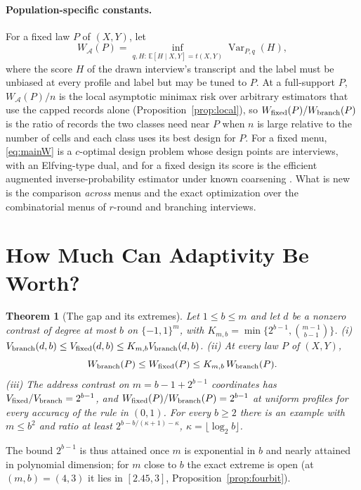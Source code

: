 \documentclass{article}
\newtheorem{theorem}{Theorem}
\newcommand{\E}{\mathbb{E}}
\newcommand{\Var}{\operatorname{Var}}
\newcommand{\A}{\mathcal A}
\begin{document}
\paragraph{Population-specific constants.}
For a fixed law $P$ of $(X,Y)$, let
\begin{equation}
 W_{\A}(P)=\inf_{q,H:\,\E[H\mid X,Y]=t(X,Y)}\Var_{P,q}(H),\label{eq:mainW}
\end{equation}
where the score $H$ of the drawn interview's transcript and the label must be unbiased at every profile and label but may be tuned to $P$. At a full-support $P$, $W_\A(P)/n$ is the local asymptotic minimax risk over arbitrary estimators that use the capped records alone (Proposition~\ref{prop:local}), so $W_{\rm fixed}(P)/W_{\rm branch}(P)$ is the ratio of records the two classes need near $P$ when $n$ is large relative to the number of cells and each class uses its best design for $P$. For a fixed menu, \eqref{eq:mainW} is a $c$-optimal design problem whose design points are interviews, with an Elfving-type dual, and for a fixed design its score is the efficient augmented inverse-probability estimator under known coarsening \citep{elfving1952,pukelsheim1993,robins1994,tsiatis2006}. What is new is the comparison \emph{across} menus and the exact optimization over the combinatorial menus of $r$-round and branching interviews.

\section{How Much Can Adaptivity Be Worth?}\label{sec:gap}
\begin{theorem}[The gap and its extremes]\label{thm:universal}
Let $1\le b\le m$ and let $d$ be a nonzero contrast of degree at most $b$ on $\{-1,1\}^m$, with $K_{m,b}=\min\{2^{b-1},\binom{m-1}{b-1}\}$.
\textup{(i)} $V_{\rm branch}(d,b)\le V_{\rm fixed}(d,b)\le K_{m,b}V_{\rm branch}(d,b)$.
\textup{(ii)} At every law $P$ of $(X,Y)$,
\begin{equation}
 W_{\rm branch}(P)\le W_{\rm fixed}(P)\le K_{m,b}\,W_{\rm branch}(P).\label{eq:universal}
\end{equation}
\textup{(iii)} The address contrast on $m=b-1+2^{b-1}$ coordinates has $V_{\rm fixed}/V_{\rm branch}=2^{b-1}$, and $W_{\rm fixed}(P)/W_{\rm branch}(P)=2^{b-1}$ at uniform profiles for every accuracy of the rule in $(0,1)$. For every $b\ge2$ there is an example with $m\le b^2$ and ratio at least $2^{b-b/(\kappa+1)-\kappa}$, $\kappa=\lfloor\log_2 b\rfloor$.
\end{theorem}
The bound $2^{b-1}$ is thus attained once $m$ is exponential in $b$ and nearly attained in polynomial dimension; for $m$ close to $b$ the exact extreme is open (at $(m,b)=(4,3)$ it lies in $[2.45,3]$, Proposition~\ref{prop:fourbit}).
\end{document}
